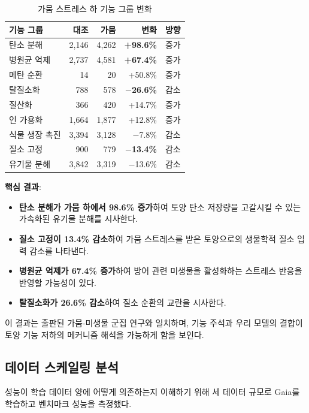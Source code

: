 \documentclass[11pt,a4paper]{article}
\begin{document}
\begin{table}[H]
\centering
\caption{가뭄 스트레스 하 기능 그룹 변화}
\label{tab:function}
\begin{tabular}{lrrrl}
\toprule
\textbf{기능 그룹} & \textbf{대조} & \textbf{가뭄} & \textbf{변화} & \textbf{방향} \\
\midrule
탄소 분해 & 2,146 & 4,262 & \textbf{+98.6\%} & 증가 \\
병원균 억제 & 2,737 & 4,581 & \textbf{+67.4\%} & 증가 \\
메탄 순환 & 14 & 20 & +50.8\% & 증가 \\
탈질소화 & 788 & 578 & \textbf{$-$26.6\%} & 감소 \\
질산화 & 366 & 420 & +14.7\% & 증가 \\
인 가용화 & 1,664 & 1,877 & +12.8\% & 증가 \\
식물 생장 촉진 & 3,394 & 3,128 & $-$7.8\% & 감소 \\
질소 고정 & 900 & 779 & \textbf{$-$13.4\%} & 감소 \\
유기물 분해 & 3,842 & 3,319 & $-$13.6\% & 감소 \\
\bottomrule
\end{tabular}
\end{table}

\textbf{핵심 결과}:
\begin{itemize}[leftmargin=1.5em]
    \item \textbf{탄소 분해가 가뭄 하에서 98.6\% 증가}하여 토양 탄소 저장량을 고갈시킬 수 있는 가속화된 유기물 분해를 시사한다.
    \item \textbf{질소 고정이 13.4\% 감소}하여 가뭄 스트레스를 받은 토양으로의 생물학적 질소 입력 감소를 나타낸다.
    \item \textbf{병원균 억제가 67.4\% 증가}하여 방어 관련 미생물을 활성화하는 스트레스 반응을 반영할 가능성이 있다.
    \item \textbf{탈질소화가 26.6\% 감소}하여 질소 순환의 교란을 시사한다.
\end{itemize}

이 결과는 출판된 가뭄-미생물 군집 연구와 일치하며, 기능 주석과 우리 모델의 결합이 토양 기능 저하의 메커니즘 해석을 가능하게 함을 보인다.

\subsection{데이터 스케일링 분석}

성능이 학습 데이터 양에 어떻게 의존하는지 이해하기 위해 세 데이터 규모로 Gaia를 학습하고 벤치마크 성능을 측정했다.
\end{document}
